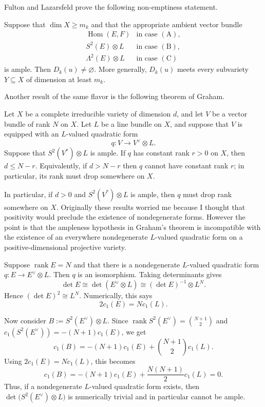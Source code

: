 \documentclass[12pt]{article}
\begin{document}
Fulton and Lazarsfeld prove the following non-emptiness statement. 

\begin{theorem}
Suppose that $\dim X\ge m_k$ and that the appropriate ambient vector bundle
$$
\begin{array}{ll}
\operatorname{Hom}(E,F) & \text{in case } \mathrm{(A)},\\[1mm]
S^2(E)\otimes L & \text{in case } \mathrm{(B)},\\[1mm]
\Lambda^2(E)\otimes L & \text{in case } \mathrm{(C)}
\end{array}
$$
is ample. Then $D_k(u)\neq \varnothing$. More generally, $D_k(u)$ meets every subvariety $Y\subseteq X$ of dimension at least $m_k$.
\end{theorem}
Another result of the same flavor is the following theorem of Graham.
\begin{theorem}[Graham]
Let $X$ be a complete irreducible variety of dimension $d$, and let $V$ be
a vector bundle of rank $N$ on $X$. Let $L$ be a line bundle on $X$, and
suppose that $V$ is equipped with an $L$-valued quadratic form
\[
    q:V\longrightarrow V^\vee\otimes L.
\]
Suppose that $S^2(V^*)\otimes L$ is ample. If $q$ has constant rank $r>0$ on $X$, then $d\le N-r$.
Equivalently, if $d>N-r$
then $q$ cannot have constant rank $r$; in particular, its rank must drop
somewhere on $X$.
\end{theorem}
In particular, if $d > 0$ and $S^2(V^*)\otimes L$ is ample, then $q$ must drop rank somewhere on $X$. Originally these results worried me because I thought that positivity would preclude the existence of nondegenerate forms. However the point is that the ampleness hypothesis in Graham's theorem is incompatible with the existence of an everywhere nondegenerate $L$-valued quadratic form on a positive-dimensional projective variety.

Suppose $\operatorname{rank}E=N$ and that there is a nondegenerate $L$-valued quadratic form $q:E\longrightarrow E^\vee\otimes L$. Then $q$ is an isomorphism. Taking determinants gives
$$\det E \cong \det(E^\vee\otimes L) \cong (\det E)^{-1}\otimes L^N.$$
Hence $(\det E)^2\cong L^N$. Numerically, this says
$$2c_1(E)=N c_1(L).$$

Now consider $B:=S^2(E^\vee)\otimes L$. Since $\operatorname{rank}S^2(E^\vee)=\binom{N+1}{2}$ and $c_1(S^2(E^\vee))=-(N+1)c_1(E)$, we get
$$c_1(B) = -(N+1)c_1(E) + \binom{N+1}{2}c_1(L).$$
Using $2c_1(E)=Nc_1(L)$, this becomes
$$c_1(B) = -(N+1)c_1(E) + \frac{N(N+1)}{2}c_1(L) = 0.$$
Thus, if a nondegenerate $L$-valued quadratic form exists, then $\det\bigl(S^2(E^\vee)\otimes L\bigr)$ is numerically trivial and in particular cannot be ample.
\end{document}
